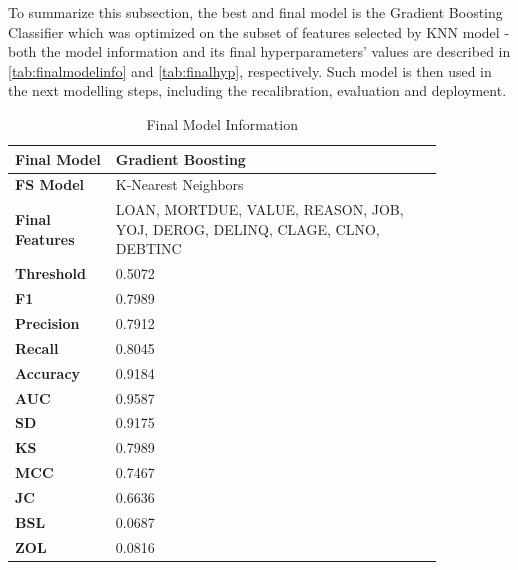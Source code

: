 To summarize this subsection, the best and final model is the Gradient Boosting Classifier which was optimized on the subset of features selected by KNN model - both the model information and its final hyperparameters' values are described in \autoref{tab:finalmodelinfo} and \autoref{tab:finalhyp}, respectively. Such model is then used in the next modelling steps, including the recalibration, evaluation and deployment.
\begin{table}[H]
    \small
    \setlength{\tabcolsep}{8pt}
    \renewcommand{\arraystretch}{1.3}
    \centering
    \caption{Final Model Information}\label{tab:finalmodelinfo}
    \begin{tabular}{p{0.20\linewidth}|p{0.65\linewidth}}
    \toprule
    \midrule
    \textbf{Final Model} & Gradient Boosting \\
    \midrule
    \textbf{FS Model} & K-Nearest Neighbors \\
    \midrule
    \textbf{Final Features} &
    LOAN, MORTDUE, VALUE, REASON, JOB, YOJ, DEROG, DELINQ, CLAGE, CLNO, DEBTINC \\
    \midrule
    \textbf{Threshold} & 0.5072 \\
    \midrule
    \textbf{F1} & 0.7989 \\
    \midrule
    \textbf{Precision} & 0.7912 \\
    \midrule
    \textbf{Recall} & 0.8045 \\
    \midrule
    \textbf{Accuracy} & 0.9184 \\
    \midrule
    \textbf{AUC} & 0.9587 \\
    \midrule
    \textbf{SD} & 0.9175 \\
    \midrule
    \textbf{KS} & 0.7989 \\
    \midrule
    \textbf{MCC} & 0.7467 \\
    \midrule
    \textbf{JC} & 0.6636 \\
    \midrule
    \textbf{BSL} & 0.0687\\
    \midrule
    \textbf{ZOL} & 0.0816 \\
    \midrule
    \bottomrule
    \end{tabular}
    \vspace{0.5em}

    \vspace{-0.5em}
    \end{table}


